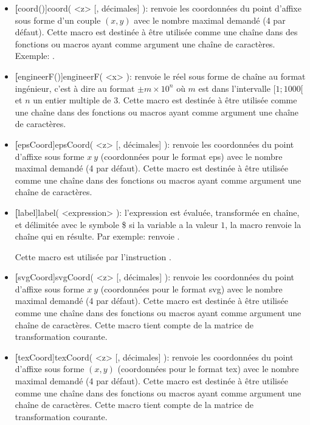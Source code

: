 \begin{itemize}
\item \textbf[coord()]{coord( <z> [, décimales] )}: renvoie les coordonnées du point d'affixe  sous forme d'un couple $(x,y)$ avec le nombre maximal  demandé (4 par défaut). Cette macro est destinée à être utilisée comme une chaîne dans des fonctions ou macros ayant comme argument une chaîne de caractères. Exemple:
.

\item \textbf[engineerF()]{engineerF( <x> )}: renvoie le réel  sous forme de chaîne au format ingénieur, c'est à dire au format $\pm m\times 10^n$ où $m$ est dans l'intervalle $[1;1000[$ et $n$ un entier multiple de $3$. Cette macro est destinée à être utilisée comme une chaîne dans des fonctions ou macros ayant comme argument une chaîne de caractères.

\item \textbf[epsCoord]{epsCoord( <z> [, décimales] )}: renvoie les coordonnées du point d'affixe  sous forme $x\ y$ (coordonnées pour le format eps) avec le nombre maximal  demandé (4 par défaut). Cette macro est destinée à être utilisée comme une chaîne dans des fonctions ou macros ayant comme argument une chaîne de caractères.

\item \textbf[label]{label( <expression> )}: l'expression est évaluée, transformée en chaîne, et délimitée avec le symbole \$ si la variable  a la valeur $1$, la macro renvoie la chaîne qui en résulte. Par exemple: \co{ [dollar:=1, label(2+2)]} renvoie .

Cette macro est utilisée par l'instruction . 

\item \textbf[svgCoord]{svgCoord( <z> [, décimales] )}: renvoie les coordonnées du point d'affixe  sous forme $x\ y$ (coordonnées pour le format svg) avec le nombre maximal  demandé (4 par défaut). Cette macro est destinée à être utilisée comme une chaîne dans des fonctions ou macros ayant comme argument une chaîne de caractères. Cette macro tient compte de la matrice de transformation courante.

\item \textbf[texCoord]{texCoord( <z> [, décimales] )}: renvoie les coordonnées du point d'affixe  sous forme $(x,y)$ (coordonnées pour le format tex) avec le nombre maximal  demandé (4 par défaut). Cette macro est destinée à être utilisée comme une chaîne dans des fonctions ou macros ayant comme argument une chaîne de caractères. Cette macro tient compte de la matrice de transformation courante.


\end{itemize}
